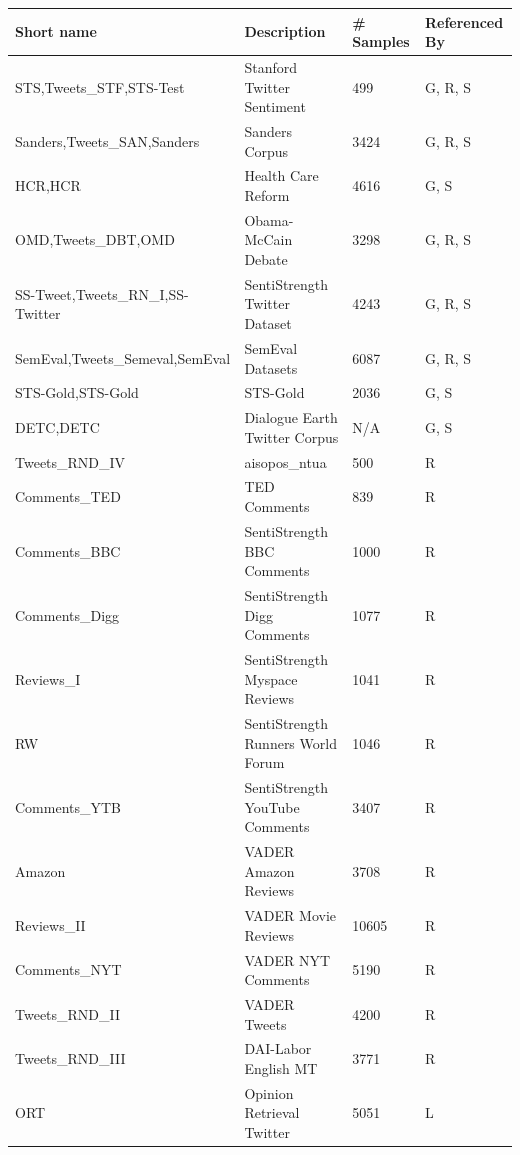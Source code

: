 
\begin{tabular}{l | l | l | l}
  \hline
  Short name & Description & \# Samples & Referenced By\\
  \hline
STS,Tweets\_STF,STS-Test & Stanford Twitter Sentiment & 499 & G, R, S\\
Sanders,Tweets\_SAN,Sanders & Sanders Corpus & 3424 & G, R, S\\
HCR,HCR & Health Care Reform & 4616 & G, S\\
OMD,Tweets\_DBT,OMD & Obama-McCain Debate & 3298 & G, R, S\\
SS-Tweet,Tweets\_RN\_I,SS-Twitter & SentiStrength Twitter Dataset & 4243 & G, R, S\\
SemEval,Tweets\_Semeval,SemEval & SemEval Datasets & 6087 & G, R, S\\
STS-Gold,STS-Gold & STS-Gold & 2036 & G, S\\
DETC,DETC & Dialogue Earth Twitter Corpus & N/A & G, S\\
Tweets\_RND\_IV & aisopos\_ntua & 500 & R\\
Comments\_TED & TED Comments & 839 & R\\
Comments\_BBC & SentiStrength BBC Comments & 1000 & R\\
Comments\_Digg & SentiStrength Digg Comments & 1077 & R\\
Reviews\_I & SentiStrength Myspace Reviews & 1041 & R\\
RW & SentiStrength Runners World Forum & 1046 & R\\
Comments\_YTB & SentiStrength YouTube Comments & 3407 & R\\
Amazon & VADER Amazon Reviews & 3708 & R\\
Reviews\_II & VADER Movie Reviews & 10605 & R\\
Comments\_NYT & VADER NYT Comments & 5190 & R\\
Tweets\_RND\_II & VADER Tweets & 4200 & R\\
Tweets\_RND\_III & DAI-Labor English MT & 3771 & R\\
ORT & Opinion Retrieval Twitter & 5051 & L\\

\end{tabular}